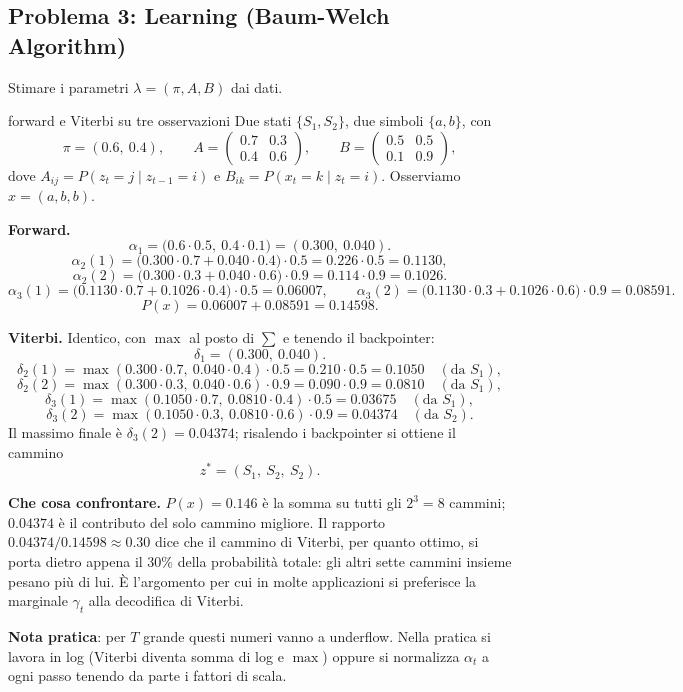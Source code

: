 \subsection{Problema 3: Learning (Baum-Welch Algorithm)}

Stimare i parametri $\lambda = (\pi, A, B)$ dai dati.

\begin{esempiosvolto}{forward e Viterbi su tre osservazioni}
Due stati $\{S_1, S_2\}$, due simboli $\{a, b\}$, con
\[
\pi = (0.6,\ 0.4), \qquad
A = \begin{pmatrix} 0.7 & 0.3 \\ 0.4 & 0.6 \end{pmatrix}, \qquad
B = \begin{pmatrix} 0.5 & 0.5 \\ 0.1 & 0.9 \end{pmatrix},
\]
dove $A_{ij} = P(z_t{=}j \mid z_{t-1}{=}i)$ e $B_{ik} = P(x_t{=}k \mid z_t{=}i)$. Osserviamo $x = (a, b, b)$.

\medskip
\textbf{Forward.}
\[
\alpha_1 = \big(0.6 \cdot 0.5,\ 0.4 \cdot 0.1\big) = (0.300,\ 0.040).
\]
\[
\alpha_2(1) = \big(0.300 \cdot 0.7 + 0.040 \cdot 0.4\big) \cdot 0.5 = 0.226 \cdot 0.5 = 0.1130,
\]
\[
\alpha_2(2) = \big(0.300 \cdot 0.3 + 0.040 \cdot 0.6\big) \cdot 0.9 = 0.114 \cdot 0.9 = 0.1026.
\]
\[
\alpha_3(1) = \big(0.1130 \cdot 0.7 + 0.1026 \cdot 0.4\big) \cdot 0.5 = 0.06007, \qquad
\alpha_3(2) = \big(0.1130 \cdot 0.3 + 0.1026 \cdot 0.6\big) \cdot 0.9 = 0.08591.
\]
\[
P(x) = 0.06007 + 0.08591 = \mathbf{0.14598}.
\]

\medskip
\textbf{Viterbi.} Identico, con $\max$ al posto di $\sum$ e tenendo il backpointer:
\[
\delta_1 = (0.300,\ 0.040).
\]
\[
\delta_2(1) = \max(0.300 \cdot 0.7,\ 0.040 \cdot 0.4) \cdot 0.5 = 0.210 \cdot 0.5 = 0.1050 \quad (\text{da } S_1),
\]
\[
\delta_2(2) = \max(0.300 \cdot 0.3,\ 0.040 \cdot 0.6) \cdot 0.9 = 0.090 \cdot 0.9 = 0.0810 \quad (\text{da } S_1),
\]
\[
\delta_3(1) = \max(0.1050 \cdot 0.7,\ 0.0810 \cdot 0.4) \cdot 0.5 = 0.03675 \quad (\text{da } S_1),
\]
\[
\delta_3(2) = \max(0.1050 \cdot 0.3,\ 0.0810 \cdot 0.6) \cdot 0.9 = 0.04374 \quad (\text{da } S_2).
\]
Il massimo finale è $\delta_3(2) = 0.04374$; risalendo i backpointer si ottiene il cammino
\[
z^* = (S_1,\ S_2,\ S_2).
\]

\medskip
\textbf{Che cosa confrontare.} $P(x) = 0.146$ è la somma su tutti gli $2^3 = 8$ cammini; $0.04374$ è il contributo del solo cammino migliore. Il rapporto $0.04374/0.14598 \approx 0.30$ dice che il cammino di Viterbi, per quanto ottimo, si porta dietro appena il $30\%$ della probabilità totale: gli altri sette cammini insieme pesano più di lui. È l'argomento per cui in molte applicazioni si preferisce la marginale $\gamma_t$ alla decodifica di Viterbi.

\textbf{Nota pratica}: per $T$ grande questi numeri vanno a underflow. Nella pratica si lavora in log (Viterbi diventa somma di log e $\max$) oppure si normalizza $\alpha_t$ a ogni passo tenendo da parte i fattori di scala.
\end{esempiosvolto}

